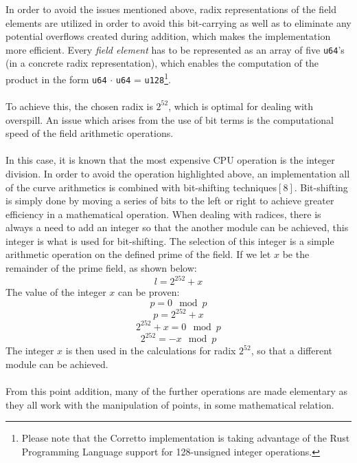 \documentclass{article}
\begin{document}
In order to avoid the issues mentioned above, radix representations of the field elements are utilized in order to avoid this bit-carrying as well as to eliminate any potential overflows created during addition, which makes the implementation more efficient. Every \textit{field element} has to be represented as an array of five \texttt{u64}'s (in a concrete radix representation), which enables the computation of the product in the form \texttt{u64} $\cdot$ \texttt{u64} = \texttt{u128}\footnote{Please note that the Corretto implementation is taking advantage of the Rust Programming Language support for 128-unsigned integer operations.}.
\\\\
To achieve this, the chosen radix is $2^{52}$, which is optimal for dealing with overspill. An issue which arises from the use of bit terms is the computational speed of the field arithmetic operations. \\\\
In this case, it is known that the most expensive CPU operation is the integer division. In order to avoid the operation highlighted above, an implementation all of the curve arithmetics is combined with bit-shifting techniques$[8]$. Bit-shifting is simply done by moving a series of bits to the left or right to achieve greater efficiency in a mathematical operation. When dealing with radices, there is always a need to add an integer so that the another module can be achieved, this integer is what is used for bit-shifting. The selection of this integer is a simple arithmetic operation on the defined prime of the field. 
If we let $x$ be the remainder of the prime field, as shown below:
$$ l = 2^{252}+x $$
The value of the integer $x$ can be proven:
$$ p = 0\mod p$$  
$$ p = 2^{252}+x $$
$$ 2^{252}+x = 0\mod p $$
$$ 2^{252} = -x\mod p $$
The integer $x$ is then used in the calculations for radix $2^{52}$, so that a different module can be achieved. \\\\
From this point addition, many of the further operations are made elementary as they all work with the manipulation of points, in some mathematical relation.  


\newpage
\end{document}

